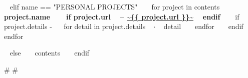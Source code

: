 \begin{minipage}{\textwidth}

~{ elif name == "PERSONAL PROJECTS" }~
  ~{ for project in contents }~
    {\small\bf ~{{ project.name }}~ ~{ if project.url }~ -- \color{maincolor}\url{~{{ project.url }}~} ~{ endif }~ }
    \vspace{1mm}
    ~{ if project.details -}~
    ~{ for detail in project.details }~
      $\cdot$ \small ~{{ detail }}~
    ~{ endfor }~
    ~{ endif }~
    \vspace{3mm}
  ~{ endfor }~
  \vspace{15mm}


\vspace{10mm}
~{ else }~
  ~{{ contents }}~
  \bigskip
~{ endif }~
\end{minipage}



{# 
#}

